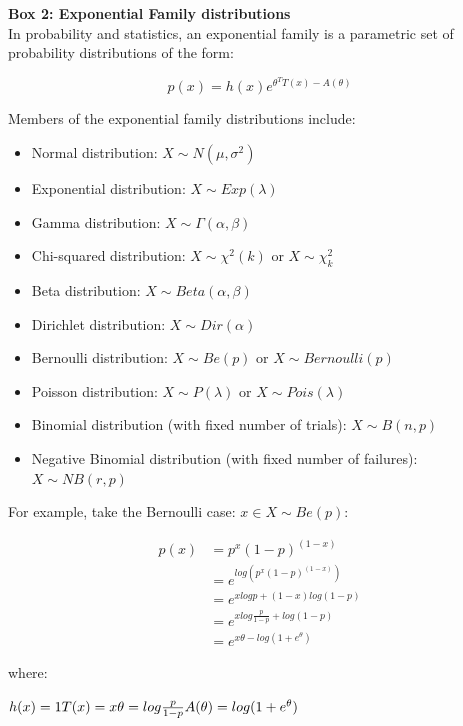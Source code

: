 \begin{Comment}
\hspace{-2.5mm}\textbf{Box 2: Exponential Family distributions}\label{box2}\\
In probability and statistics, an exponential family is a parametric set of probability distributions of the form:

\begin{equation*}
    p(x) = h(x)e^{\theta^TT(x)-A(\theta)}
\end{equation*}

Members of the exponential family distributions include:
\begin{itemize}
    \item Normal distribution: $X \sim N(\mu,\sigma^2)$
    \item Exponential distribution: $ X \sim Exp(\lambda)$
    \item Gamma distribution: $ X \sim \Gamma(\alpha,\beta)$
    \item Chi-squared distribution: $ X \sim \chi^2 (k)$ or $ X \sim \chi_k^2$
    \item Beta distribution: $ X \sim Beta(\alpha,\beta)$
    \item Dirichlet distribution: $ X \sim Dir(\alpha)$
    \item Bernoulli distribution: $ X \sim Be(p)$ or $ X \sim Bernoulli(p)$
    \item Poisson distribution: $ X \sim P(\lambda)$ or $ X \sim Pois(\lambda)$
    \item Binomial distribution (with fixed number of trials): $ X \sim B(n,p)$
    \item Negative Binomial distribution (with fixed number of failures): $ X \sim NB(r,p)$\\
\end{itemize}

For example, take the Bernoulli case: $x \in X \sim Be(p)$:

\begin{equation*}
\begin{split}
    p(x) & = p^x(1-p)^{(1-x)}\\
         & = e^{log(p^x(1-p)^{(1-x)})}\\
         & = e^{xlogp + (1-x)log(1-p)}\\
         & = e^{xlog\frac{p}{1-p}+log(1-p)}\\
         & = e^{x\theta - log(1+e^\theta)}
\end{split}
\end{equation*}

where: 

\hfill $h(x)=1 \hfill T(x)=x \hfill \theta = log \frac{p}{1-p} \hfill A(\theta) = log(1+e^\theta)$ \hfill

\end{Comment}

